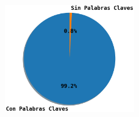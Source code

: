 \documentclass[titlepage,a4paper]{article}
\begin{document}
{{\par}
\begin{figure}[H]
 \centering
 \includegraphics[width=0.5\textwidth, height=0.5\textheight, keepaspectratio]{graficos/pie_tweets_con_o_sin_palabras_claves.png}
\end{figure}
\par}
\end{document}
